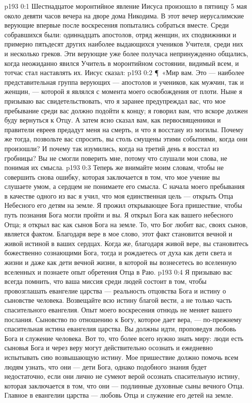 \author{Комиссия срединников}
\vs p193 0:1 Шестнадцатое моронтийное явление Иисуса произошло в пятницу 5 мая около девяти часов вечера на дворе дома Никодима. В этот вечер иерусалимские верующие впервые после воскресения попытались собраться вместе. Среди собравшихся были: одиннадцать апостолов, отряд женщин, их сподвижники и примерно пятьдесят других наиболее выдающихся учеников Учителя, среди них и несколько греков. Эти верующие уже более получаса непринужденно общались, когда неожиданно явился Учитель в моронтийном состоянии, видимый всем, и тотчас стал наставлять их. Иисус сказал:
\vs p193 0:2 \P\ «Мир вам. Это --- наиболее представительная группа верующих --- апостолов и учеников, как мужчин, так и женщин, --- которой я являлся с момента моего освобождения от плоти. Ныне я призываю вас свидетельствовать, что я заранее предупреждал вас, что мое пребывание среди вас должно подойти к концу; я говорил вам, что вскоре должен буду вернуться к Отцу. А затем ясно сказал вам, как первосвященники и правители евреев предадут меня на смерть, и что я восстану из могилы. Почему же тогда, позвольте вас спросить, вы столь смущены этими событиями, когда они произошли? И почему так изумились, когда на третий день я восстал из гробницы? Вы не смогли поверить мне, потому что слушали мои слова, не понимая их смысла.
\vs p193 0:3 Теперь же внимайте моим словам, чтобы не совершить снова ошибку, которая заключается в том, что мое учение вы слушаете умом, а сердцем не понимаете его смысла. С начала моего пребывания в качестве одного из вас я учил, что моя единственная цель --- открыть Отца Небесного его детям на земле. Я прожил открывающее Бога пришествие, чтобы путь познания Бога могли пройти и вы. Я открыл Бога как вашего небесного Отца; я открыл вас как сынов Бога на земле. То, что Бог любит вас, своих сынов, является фактом. Благодаря вере в мое слово, этот факт становится вечной и живой истиной в ваших сердцах. Когда же, благодаря живой вере, вы становитесь божественно сознающими Бога, тогда и рождаетесь от духа как дети света и жизни и даже как дети вечной жизни, в которой вы вознесетесь во вселенную вселенных и познаете опыт обретения Отца в Раю.
\vs p193 0:4 Я призываю вас всегда помнить, что ваша миссия среди людей состоит в том, чтобы провозглашать евангелие царства --- реальность отцовства Бога и истину о сыновстве человека. Возвещайте всю истину благой вести, а не только часть спасительного евангелия. Опыт моего воскресения отнюдь не меняет вашего послания. Сыновство по отношению к Богу, которое дает вера, --- по\hyp{}прежнему спасительная истина евангелия царства. Вы должны идти, проповедуя любовь Бога и служение человека. Вот то, что более всего нужно знать миру: люди есть сыновья Бога и через веру могут действительно осознать и ежедневно испытывать сию возвышающую истину. Мое пришествие должно помочь всем людям узнать, что они --- дети Бога, однако подобного знания будет недостаточно, если они лично не сумеют верой осознать спасительную истину, которая заключается в том, что они --- подлинные духовные сыны вечного Отца. Главное в евангелии царства --- любовь Отца и служение его детей на земле.
